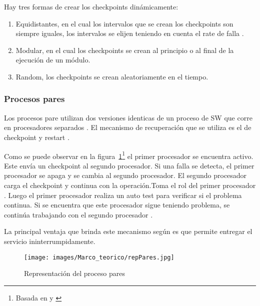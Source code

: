 Hay tres formas de crear los checkpoints dinámicamente:
\begin{enumerate}
 \item Equidistantes, en el cual los intervalos que se crean los checkpoints son siempre iguales, 
los intervalos se elijen teniendo en cuenta el rate de falla \citep{FTDesign}. 
 \item Modular, en el cual los checkpoints se crean al principio o al final de la ejecución de un 
módulo. 
 \item Random, los checkpoints se crean aleatoriamente en el tiempo. 
\end{enumerate}

\subsubsection{Procesos pares}
Los procesos pare utilizan dos versiones identicas de un proceso de \ac{SW} que corre en 
procesadores separados \citep{FTDesign} \citep{SoftwareFaultToleranceATutorial}. El mecanismo de 
recuperación que se utiliza es el de checkpoint y restart \citep{SoftwareFaultToleranceATutorial}.  

Como se puede observar en la figura~\ref{fig:repPares}\footnote{Basada en \cite{FTDesign} y 
\cite{SoftwareFaultToleranceATutorial}} el primer procesador se encuentra activo. Este envía un 
checkpoint al segundo procesador. Si una falla se detecta, el primer procesador se apaga y se cambia 
al segundo procesador. El segundo procesador carga el checkpoint y continua con la operación.Toma el 
rol del primer procesador \citep{SoftwareFaultToleranceATutorial}. Luego el 
primer procesador realiza un auto test para verificar si el problema continua. Si se encuentra que 
este procesador sigue teniendo problema, se continúa trabajando con el segundo procesador 
\citep{FTDesign}.

La principal ventaja que brinda este mecanismo según \cite{FTDesign} es que permite entregar el 
servicio ininterrumpidamente.

\begin{figure}[h]
 \centering
 \texttt{[image: images/Marco\_teorico/repPares.jpg]}
 \caption{Representación del proceso pares}
 \label{fig:repPares}
\end{figure} 

